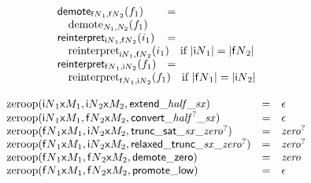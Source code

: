 $$\begin{array}[t]{@{}lcl@{}l@{}}
{} \\
{\mathsf{demote}}{{}_{{{\mathsf{f}}{N}}_1, {{\mathsf{f}}{N}}_2}(f_1)} & = & & \\
 \multicolumn{4}{@{}l@{}}{\quad
\begin{array}[t]{@{}l@{}}
{{\mathrm{demote}}}_{N_1, N_2}(f_1) \\
\end{array}
} \\
{\mathsf{reinterpret}}{{}_{{{\mathsf{i}}{N}}_1, {{\mathsf{f}}{N}}_2}(i_1)} & = & & \\
 \multicolumn{4}{@{}l@{}}{\quad
\begin{array}[t]{@{}l@{}l@{}}
{{\mathrm{reinterpret}}}_{{{\mathsf{i}}{N}}_1, {{\mathsf{f}}{N}}_2}(i_1) & \quad \mbox{if}~ {|{{\mathsf{i}}{N}}_1|} = {|{{\mathsf{f}}{N}}_2|} \\
\end{array}
} \\
{\mathsf{reinterpret}}{{}_{{{\mathsf{f}}{N}}_1, {{\mathsf{i}}{N}}_2}(f_1)} & = & & \\
 \multicolumn{4}{@{}l@{}}{\quad
\begin{array}[t]{@{}l@{}l@{}}
{{\mathrm{reinterpret}}}_{{{\mathsf{f}}{N}}_1, {{\mathsf{i}}{N}}_2}(f_1) & \quad \mbox{if}~ {|{{\mathsf{f}}{N}}_1|} = {|{{\mathsf{i}}{N}}_2|} \\
\end{array}
} \\
\end{array}
$$

\vspace{1ex}

$$
\begin{array}[t]{@{}lcl@{}l@{}}
{\mathrm{zeroop}}({{{\mathsf{i}}{N}}_1}{\mathsf{x}}{M_1}, {{{\mathsf{i}}{N}}_2}{\mathsf{x}}{M_2}, {\mathsf{extend}}{\mathsf{\_}}{{\mathit{half}}}{\mathsf{\_}}{{\mathit{sx}}}) & = & \epsilon \\
{\mathrm{zeroop}}({{{\mathsf{i}}{N}}_1}{\mathsf{x}}{M_1}, {{{\mathsf{f}}{N}}_2}{\mathsf{x}}{M_2}, {\mathsf{convert}}{\mathsf{\_}}{{{\mathit{half}}^?}}{\mathsf{\_}}{{\mathit{sx}}}) & = & \epsilon \\
{\mathrm{zeroop}}({{{\mathsf{f}}{N}}_1}{\mathsf{x}}{M_1}, {{{\mathsf{i}}{N}}_2}{\mathsf{x}}{M_2}, {\mathsf{trunc\_sat}}{\mathsf{\_}}{{\mathit{sx}}}{\mathsf{\_}}{{{\mathit{zero}}^?}}) & = & {{\mathit{zero}}^?} \\
{\mathrm{zeroop}}({{{\mathsf{f}}{N}}_1}{\mathsf{x}}{M_1}, {{{\mathsf{i}}{N}}_2}{\mathsf{x}}{M_2}, {\mathsf{relaxed\_trunc}}{\mathsf{\_}}{{\mathit{sx}}}{\mathsf{\_}}{{{\mathit{zero}}^?}}) & = & {{\mathit{zero}}^?} \\
{\mathrm{zeroop}}({{{\mathsf{f}}{N}}_1}{\mathsf{x}}{M_1}, {{{\mathsf{f}}{N}}_2}{\mathsf{x}}{M_2}, {\mathsf{demote}}{\mathsf{\_}}{\mathsf{zero}}) & = & {\mathit{zero}} \\
{\mathrm{zeroop}}({{{\mathsf{f}}{N}}_1}{\mathsf{x}}{M_1}, {{{\mathsf{f}}{N}}_2}{\mathsf{x}}{M_2}, {\mathsf{promote}}{\mathsf{\_}}{\mathsf{low}}) & = & \epsilon \\
\end{array}
$$

